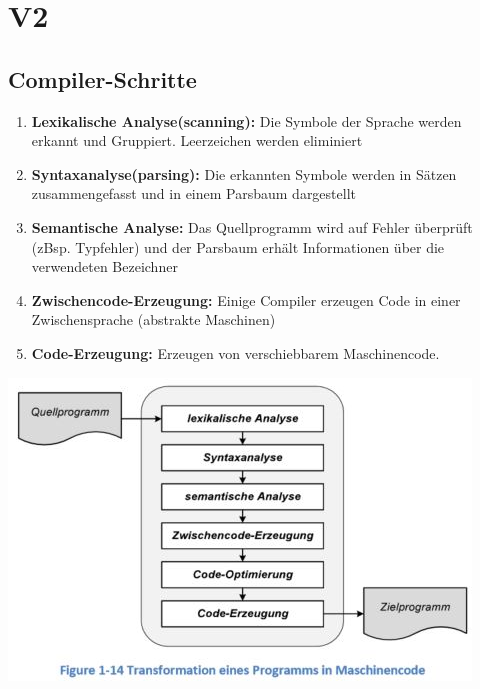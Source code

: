 \section{V2}
\subsection{Compiler-Schritte}
\vspace{-0.5cm}
\begin{multicols}{2}
    \begin{minipage}{\linewidth}
        \begin{enumerate}
            \item \textbf{Lexikalische Analyse(scanning):}\newline
                Die Symbole der Sprache werden erkannt und Gruppiert. Leerzeichen werden eliminiert
            \item \textbf{Syntaxanalyse(parsing):}\newline
                 Die erkannten Symbole werden in Sätzen zusammengefasst und in einem Parsbaum dargestellt
            \item \textbf{Semantische Analyse:}\newline
                 Das Quellprogramm wird auf Fehler überprüft (zBsp. Typfehler) und der Parsbaum erhält Informationen über die verwendeten Bezeichner
            \item \textbf{Zwischencode-Erzeugung:}\newline
                 Einige Compiler erzeugen Code in einer Zwischensprache (abstrakte Maschinen)
            \item \textbf{Code-Erzeugung:}\newline
                 Erzeugen von verschiebbarem Maschinencode.      
        \end{enumerate}
    \end{minipage}

    \includegraphics[width=\linewidth]{images/CompilerWorkflow2}
\end{multicols}

